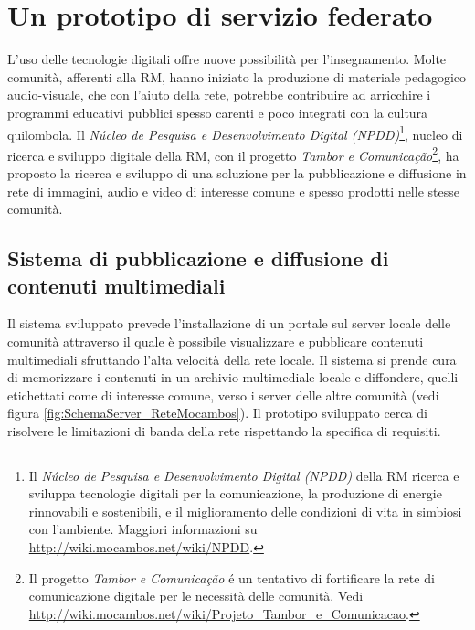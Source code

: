 
\chapter{Un prototipo di servizio federato}
\label{Capitolo4}

L'uso delle tecnologie digitali offre nuove possibilità per
l'insegnamento. Molte comunità, afferenti alla RM, hanno iniziato la
produzione di materiale pedagogico audio-visuale, che con l'aiuto
della rete, potrebbe contribuire ad arricchire i programmi educativi
pubblici spesso carenti e poco integrati con la cultura quilombola. Il
\emph{Núcleo de Pesquisa e Desenvolvimento Digital (NPDD)}\footnote{Il
  \emph{Núcleo de Pesquisa e Desenvolvimento Digital (NPDD)} della RM
  ricerca e sviluppa tecnologie digitali per la comunicazione, la
  produzione di energie rinnovabili e sostenibili, e il miglioramento
  delle condizioni di vita in simbiosi con l'ambiente. Maggiori
  informazioni su \url{http://wiki.mocambos.net/wiki/NPDD}.}, nucleo
di ricerca e sviluppo digitale della RM, con il progetto \emph{Tambor
  e Comunicação}\footnote{Il progetto \emph{Tambor e Comunicação} é un
  tentativo di fortificare la rete di comunicazione digitale per le
  necessità delle comunità. Vedi
  \url{http://wiki.mocambos.net/wiki/Projeto_Tambor_e_Comunicacao}.},
ha proposto la ricerca e sviluppo di una soluzione per la
pubblicazione e diffusione in rete di immagini, audio e video di
interesse comune e spesso prodotti nelle stesse comunità.


\section{Sistema di pubblicazione e diffusione di contenuti
  multimediali}
Il sistema sviluppato prevede l'installazione di un portale sul server
locale delle comunità attraverso il quale è possibile visualizzare e
pubblicare contenuti multimediali sfruttando l'alta velocità della
rete locale. Il sistema si prende cura di memorizzare i contenuti in
un archivio multimediale locale e diffondere, quelli etichettati come
di interesse comune, verso i server delle altre comunità (vedi figura
\ref{fig:SchemaServer_ReteMocambos}). Il prototipo sviluppato cerca di
risolvere le limitazioni di banda della rete rispettando la specifica
di requisiti. 

